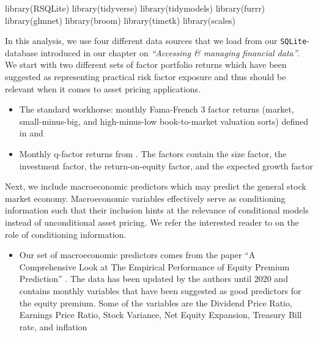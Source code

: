 \documentclass[
]{book}
\newenvironment{Shaded}{\begin{snugshade}}{\end{snugshade}}
\newcommand{\FunctionTok}[1]{\textcolor[rgb]{0,0,0}{#1}}
\newcommand{\NormalTok}[1]{#1}
\providecommand{\tightlist}{%
  \setlength{\itemsep}{0pt}\setlength{\parskip}{0pt}}
\begin{document}
\begin{Shaded}
\begin{Highlighting}[]
\FunctionTok{library}\NormalTok{(RSQLite)}
\FunctionTok{library}\NormalTok{(tidyverse)}
\FunctionTok{library}\NormalTok{(tidymodels)}
\FunctionTok{library}\NormalTok{(furrr)}
\FunctionTok{library}\NormalTok{(glmnet)}
\FunctionTok{library}\NormalTok{(broom)}
\FunctionTok{library}\NormalTok{(timetk)}
\FunctionTok{library}\NormalTok{(scales)}
\end{Highlighting}
\end{Shaded}

In this analysis, we use four different data sources that we load from our \texttt{SQLite}-database introduced in our chapter on \emph{``Accessing \& managing financial data''}. We start with two different sets of factor portfolio returns which have been suggested as representing practical risk factor exposure and thus should be relevant when it comes to asset pricing applications.

\begin{itemize}
\tightlist
\item
  The standard workhorse: monthly Fama-French 3 factor returns (market, small-minus-big, and high-minus-low book-to-market valuation sorts) defined in \citet{Fama1992} and \citet{Fama1993}
\item
  Monthly q-factor returns from \citet{Hou2015}. The factors contain the size factor, the investment factor, the return-on-equity factor, and the expected growth factor
\end{itemize}

Next, we include macroeconomic predictors which may predict the general stock market economy. Macroeconomic variables effectively serve as conditioning information such that their inclusion hints at the relevance of conditional models instead of unconditional asset pricing. We refer the interested reader to \citet{Cochrane2005} on the role of conditioning information.

\begin{itemize}
\tightlist
\item
  Our set of macroeconomic predictors comes from the paper ``A Comprehensive Look at The Empirical Performance of Equity Premium Prediction'' \citep{Goyal2008}. The data has been updated by the authors until 2020 and contains monthly variables that have been suggested as good predictors for the equity premium. Some of the variables are the Dividend Price Ratio, Earnings Price Ratio, Stock Variance, Net Equity Expansion, Treasury Bill rate, and inflation
\end{itemize}
\end{document}
